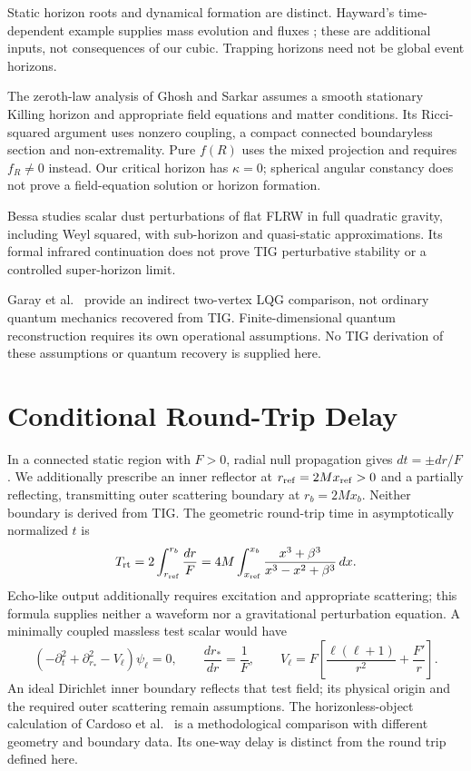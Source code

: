 \documentclass[11pt,a4paper]{article}
\begin{document}
Static horizon roots and dynamical formation are distinct. Hayward's
time-dependent example supplies mass evolution and fluxes
\cite{hayward2006}; these are additional inputs, not consequences of our cubic.
Trapping horizons need not be global event horizons.

The zeroth-law analysis of Ghosh and Sarkar \cite{ghosh2026zerothlaw}
assumes a smooth stationary Killing horizon and appropriate field equations
and matter conditions. Its Ricci-squared argument uses nonzero coupling,
a compact connected boundaryless section and non-extremality. Pure $f(R)$
uses the mixed projection and requires $f_R\ne0$ instead.
Our critical horizon has $\kappa=0$; spherical angular constancy does not
prove a field-equation solution or horizon formation.

Bessa \cite{bessa2026matterdensityquadratic} studies scalar dust perturbations
of flat FLRW in full quadratic gravity, including Weyl squared, with
sub-horizon and quasi-static approximations. Its formal infrared continuation
does not prove TIG perturbative stability or a controlled super-horizon limit.

Garay et al.\ \cite{garay2026globalvariablesemergentcosmology} provide an
indirect two-vertex LQG comparison, not ordinary quantum mechanics recovered
from TIG. Finite-dimensional quantum reconstruction
\cite{chiribella2011} requires its own operational assumptions.
No TIG derivation of these assumptions or quantum recovery is supplied here.

\section{Conditional Round-Trip Delay}

In a connected static region with $F>0$, radial null propagation gives
$dt=\pm dr/F$. We additionally prescribe an inner reflector at
$r_{\rm ref}=2Mx_{\rm ref}>0$ and a partially reflecting, transmitting outer
scattering boundary at $r_b=2Mx_b$. Neither boundary is derived from TIG.
The geometric round-trip time in asymptotically normalized $t$ is
\begin{equation}
T_{\rm rt}=2\int_{r_{\rm ref}}^{r_b}\frac{dr}{F}
=4M\int_{x_{\rm ref}}^{x_b}\frac{x^3+\beta^3}{x^3-x^2+\beta^3}\,dx.
\label{eq:roundtrip}
\end{equation}
Echo-like output additionally requires excitation and appropriate scattering;
this formula supplies neither a waveform nor a gravitational perturbation
equation. A minimally coupled massless test scalar would have
\begin{equation}
(-\partial_t^2+\partial_{r_*}^2-V_\ell)\psi_\ell=0,\qquad
\frac{dr_*}{dr}=\frac1F,\qquad
V_\ell=F\left[\frac{\ell(\ell+1)}{r^2}+\frac{F'}r\right].
\end{equation}
An ideal Dirichlet inner boundary reflects that test field; its physical
origin and the required outer scattering remain assumptions.
The horizonless-object calculation of Cardoso et al.\ \cite{cardoso2016}
is a methodological comparison with different geometry and boundary data.
Its one-way delay is distinct from the round trip defined here.
\end{document}
